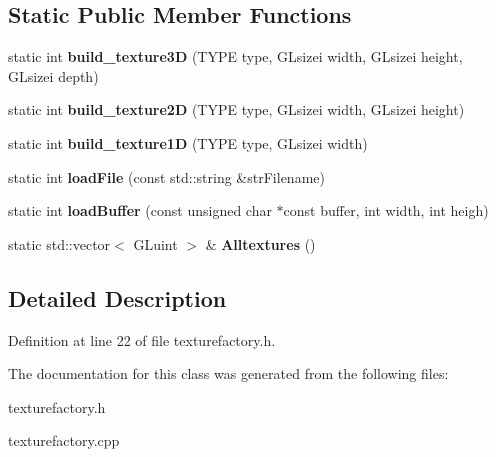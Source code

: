 \subsection*{Static Public Member Functions}
\begin{DoxyCompactItemize}
\item 
static int {\bfseries build\-\_\-texture3\-D} (T\-Y\-P\-E type, G\-Lsizei width, G\-Lsizei height, G\-Lsizei depth)\label{classSoundfieldViewer_1_1TextureFactory_a4e12008843c84d1ae4f1d9debec66073}

\item 
static int {\bfseries build\-\_\-texture2\-D} (T\-Y\-P\-E type, G\-Lsizei width, G\-Lsizei height)\label{classSoundfieldViewer_1_1TextureFactory_a0c78f9f7824d42bfa054c68c1c4dad53}

\item 
static int {\bfseries build\-\_\-texture1\-D} (T\-Y\-P\-E type, G\-Lsizei width)\label{classSoundfieldViewer_1_1TextureFactory_a0814178f3598a5d734c82e62ccc605ab}

\item 
static int {\bfseries load\-File} (const std\-::string \&str\-Filename)\label{classSoundfieldViewer_1_1TextureFactory_a3d9a95575df56af22fe6d53c33defa65}

\item 
static int {\bfseries load\-Buffer} (const unsigned char $\ast$const buffer, int width, int heigh)\label{classSoundfieldViewer_1_1TextureFactory_a2ee2ba76820475b5f311ebbcc871059a}

\item 
static std\-::vector$<$ G\-Luint $>$ \& {\bfseries Alltextures} ()\label{classSoundfieldViewer_1_1TextureFactory_af1feb241490d9bdc54857a1f446fd650}

\end{DoxyCompactItemize}


\subsection{Detailed Description}


Definition at line 22 of file texturefactory.\-h.



The documentation for this class was generated from the following files\-:\begin{DoxyCompactItemize}
\item 
texturefactory.\-h\item 
texturefactory.\-cpp\end{DoxyCompactItemize}

